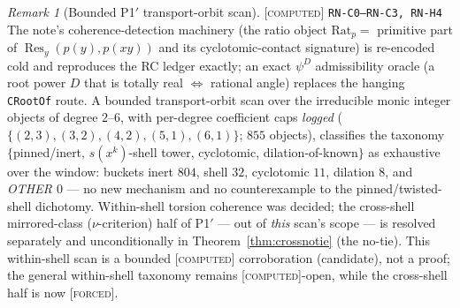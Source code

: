 \documentclass[11pt]{article}
\newcommand{\tagF}{\textcolor{cF}{\textsc{[forced]}}}
\newcommand{\tagC}{\textcolor{cC}{\textsc{[computed]}}}
\newcommand{\hx}[1]{\textcolor{cC}{\footnotesize\texttt{#1}}}
\theoremstyle{plain}
\theoremstyle{definition}
\theoremstyle{remark}
\newtheorem{remark}[theorem]{Remark}
\begin{document}
\begin{remark}[Bounded P1$'$ transport-orbit scan]\label{rem:p1scan}\tagC{} \hx{RN-C0--RN-C3, RN-H4}
The note's coherence-detection machinery (the ratio object
$\mathrm{Rat}_p=$ primitive part of $\operatorname{Res}_y(p(y),p(xy))$ and its
cyclotomic-contact signature) is re-encoded cold and reproduces the RC ledger
exactly; an exact $\psi^D$ admissibility oracle (a root power $D$ that is
totally real $\iff$ rational angle) replaces the hanging \texttt{CRootOf}
route. A bounded transport-orbit scan over the irreducible monic integer
objects of degree $2$--$6$, with per-degree coefficient caps \emph{logged}
($\{(2,3),(3,2),(4,2),(5,1),(6,1)\}$; $855$ objects), classifies the taxonomy
$\{$pinned/inert, $s(x^k)$-shell tower, cyclotomic, dilation-of-known$\}$ as
exhaustive over the window: buckets inert $804$, shell $32$, cyclotomic $11$,
dilation $8$, and \emph{OTHER $0$} --- no new mechanism and no counterexample
to the pinned/twisted-shell dichotomy. Within-shell torsion coherence was
decided; the cross-shell mirrored-class ($\nu$-criterion) half of P1$'$ --- out
of \emph{this} scan's scope --- is resolved separately and unconditionally in
Theorem~\ref{thm:crossnotie} (the no-tie). This within-shell scan is a bounded
\tagC{} corroboration (candidate), not a proof; the general within-shell
taxonomy remains \tagC{}-open, while the cross-shell half is now \tagF{}.
\end{remark}
\end{document}
